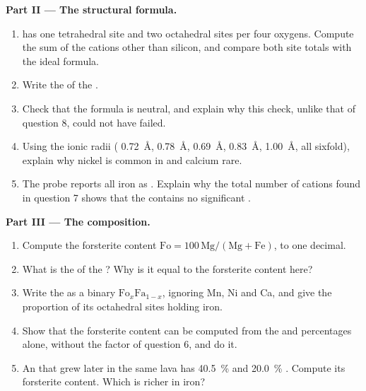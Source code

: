 \begin{problem}
\medskip
\noindent\textbf{Part II --- The structural formula.}
\begin{enumerate}[resume]
  \item {} has one tetrahedral site and two octahedral sites per four
        oxygens. Compute the sum of the cations other than silicon, and
        compare both site totals with the ideal formula.
  \item Write the  of the .
  \item Check that the formula is neutral, and explain why this check,
        unlike that of question 8, could not have failed.
  \item Using the ionic radii ( \qty{0.72}{\angstrom},
         \qty{0.78}{\angstrom}, 
        \qty{0.69}{\angstrom},  \qty{0.83}{\angstrom},
         \qty{1.00}{\angstrom}, all sixfold), explain why nickel
        is common in  and calcium rare.
  \item The probe reports all iron as . Explain why the total number
        of cations found in question 7 shows that the  contains no
        significant .
\end{enumerate}

\medskip
\noindent\textbf{Part III --- The composition.}
\begin{enumerate}[resume]
  \item Compute the forsterite content $\mathrm{Fo} = 100\,\mathrm{Mg}/(\mathrm{Mg} +
        \mathrm{Fe})$, to one decimal.
  \item What is the  of the ? Why is it equal to the
        forsterite content here?
  \item Write the  as a binary 
        $\mathrm{Fo}_x\mathrm{Fa}_{1-x}$, ignoring Mn, Ni and Ca, and give the
        proportion of its octahedral sites holding iron.
  \item Show that the forsterite content can be computed from the
         and  percentages alone, without the factor of
        question 6, and do it.
  \item An  that grew later in the same lava has \qty{40.5}{\percent}
         and \qty{20.0}{\percent} . Compute its forsterite
        content. Which  is richer in iron?
\end{enumerate}


\end{problem}
